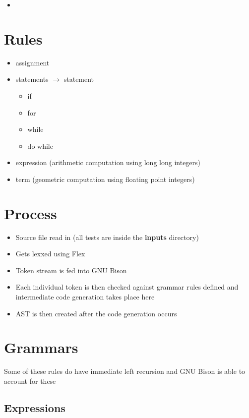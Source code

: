 \documentclass{article}
\begin{document}
\begin{itemize}
\item <++>
\end{itemize}

\section{Rules}

\begin{itemize}
\item assignment
\item statements $\rightarrow$ statement
\begin{itemize}
\item if
\item for
\item while
\item do while
\end{itemize}
\item expression (arithmetic computation using long long integers)
\item term (geometric computation using floating point integers)
\end{itemize}


\newpage

\section{Process}

\begin{itemize}
\item Source file read in (all tests are inside the \textbf{inputs} directory)
\item Gets lexxed using Flex
\item Token stream is fed into GNU Bison
\item Each individual token is then checked against grammar rules defined and intermediate code generation takes place here
\item AST is then created after the code generation occurs
\end{itemize}

\newpage

\section{Grammars}

Some of these rules do have immediate left recursion and GNU Bison is able to account for these

\subsection{Expressions}
\end{document}
